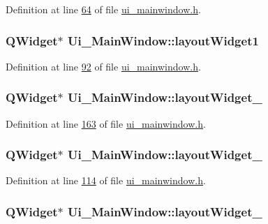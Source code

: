 Definition at line \hyperlink{a00052_source_l00064}{64} of file \hyperlink{a00052_source}{ui\+\_\+mainwindow.\+h}.

\hypertarget{a00027_aab31b3dec8d767525dea6f163e029e48}{
\subsubsection[{layout\+Widget1}]{\setlength{\rightskip}{0pt plus 5cm}Q\+Widget$\ast$ Ui\+\_\+\+Main\+Window\+::layout\+Widget1}}\label{a00027_aab31b3dec8d767525dea6f163e029e48}


Definition at line \hyperlink{a00052_source_l00092}{92} of file \hyperlink{a00052_source}{ui\+\_\+mainwindow.\+h}.

\hypertarget{a00027_a873441ec9cec68e0d4eacee271765553}{
\subsubsection[{layout\+Widget\+\_\+2}]{\setlength{\rightskip}{0pt plus 5cm}Q\+Widget$\ast$ Ui\+\_\+\+Main\+Window\+::layout\+Widget\+\_}}\label{a00027_a873441ec9cec68e0d4eacee271765553}


Definition at line \hyperlink{a00052_source_l00163}{163} of file \hyperlink{a00052_source}{ui\+\_\+mainwindow.\+h}.

\hypertarget{a00027_a185129091df0a390d82417f2f52cb80f}{
\subsubsection[{layout\+Widget\+\_\+3}]{\setlength{\rightskip}{0pt plus 5cm}Q\+Widget$\ast$ Ui\+\_\+\+Main\+Window\+::layout\+Widget\+\_}}\label{a00027_a185129091df0a390d82417f2f52cb80f}


Definition at line \hyperlink{a00052_source_l00114}{114} of file \hyperlink{a00052_source}{ui\+\_\+mainwindow.\+h}.

\hypertarget{a00027_ac4725768128006ab5bea6e58b67959d0}{
\subsubsection[{layout\+Widget\+\_\+4}]{\setlength{\rightskip}{0pt plus 5cm}Q\+Widget$\ast$ Ui\+\_\+\+Main\+Window\+::layout\+Widget\+\_}}\label{a00027_ac4725768128006ab5bea6e58b67959d0}


